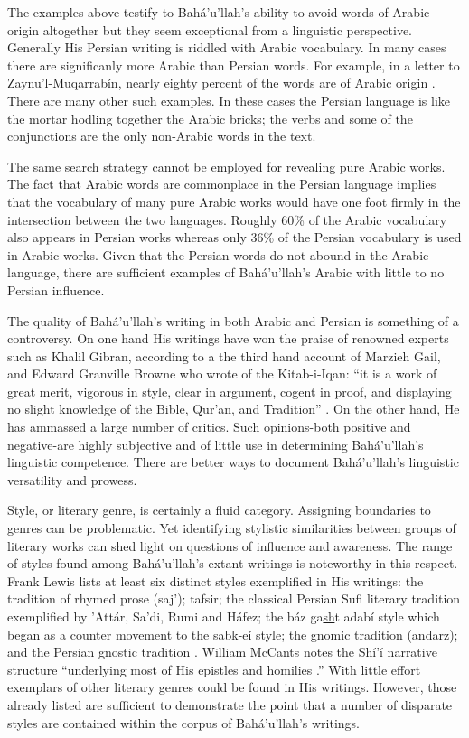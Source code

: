 \documentclass[12pt, oneside]{report}
\begin{document}
\par
The examples above testify to Bah\'{a}'u'llah's ability to avoid words of Arabic origin altogether but they seem exceptional from a linguistic perspective. Generally His Persian writing is riddled with Arabic vocabulary. In many cases there are significanly more Arabic than Persian words. For example, in a letter to Zaynu'l-Muqarrab\'{i}n, nearly eighty percent of the words are of Arabic origin \cite{bahaullah_muntakhabati-az_163}. There are many other such examples. In these cases the Persian language is like the mortar hodling together the Arabic bricks; the verbs and some of the conjunctions are the only non-Arabic words in the text. 
\par 
The same search strategy cannot be employed for revealing pure Arabic works. The fact that Arabic words are commonplace in the Persian language implies that the vocabulary of many pure Arabic works would have one foot firmly in the intersection between the two languages. Roughly 60\% of the Arabic vocabulary also appears in Persian works whereas only 36\% of the Persian vocabulary is used in Arabic works. Given that the Persian words do not abound in the Arabic language, there are sufficient examples of Bah\'{a}'u'llah's Arabic with little to no Persian influence. 
\par
The quality of Bah\'{a}'u'llah's writing in both Arabic and Persian is something of a controversy. On one hand His writings have won the praise of renowned experts such as Khalil Gibran, according to a the third hand account of Marzieh Gail, \cite{gail_world_1978} and Edward Granville Browne who wrote of the Kitab-i-Iqan: ``it is a work of great merit, vigorous in style, clear in argument, cogent in proof, and displaying no slight knowledge of the Bible, Qur'an, and Tradition'' \cite{momen_selections_1987}. On the other hand, He has ammassed a large number of critics. Such opinions-both positive and negative-are highly subjective and of little use in determining Bah\'{a}'u'llah's linguistic competence. There are better ways to document Bah\'{a}'u'llah's linguistic versatility and prowess.
\par 
Style, or literary genre, is certainly a fluid category.  Assigning boundaries to genres can be problematic. Yet identifying stylistic similarities between groups of literary works can shed light on questions of influence and awareness. The range of styles found among Bah\'{a}'u'llah's extant writings is noteworthy in this respect. Frank Lewis lists at least six distinct styles exemplified in His writings: the tradition of rhymed prose (saj'); tafsir; the classical Persian Sufi literary tradition exemplified by 'Att\'{a}r, Sa'di, Rumi and H\'{a}fez; the b\'{a}z ga\underline{sh}t adab\'{i} style which began as a counter movement to the sabk-e\'{i} style; the gnomic tradition (andarz); and the Persian gnostic tradition \cite{lewis_frank_scripture_1997}. William McCants notes the Sh\'{i}'\'{i} narrative structure ``underlying most of His epistles and homilies \cite{mccants_wronged_2002}.'' With little effort exemplars of other literary genres could be found in His writings. However, those already listed are sufficient to demonstrate the point that a number of disparate styles are contained within the corpus of Bah\'{a}'u'llah's writings.
\end{document}
